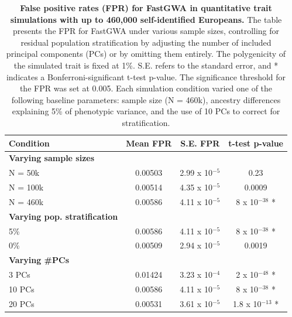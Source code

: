 \begin{table}[h!]
\centering
\caption{\textbf{False positive rates (FPR) for FastGWA in quantitative trait simulations with up to 460,000 self-identified Europeans.} The table presents the FPR for FastGWA under various sample sizes, controlling for residual population stratification by adjusting the number of included principal components (PCs) or by omitting them entirely. The polygenicity of the simulated trait is fixed at 1\%. S.E. refers to the standard error, and * indicates a Bonferroni-significant t-test p-value. The significance threshold for the FPR was set at 0.005. Each simulation condition varied one of the following baseline parameters: sample size (N = 460k), ancestry differences explaining 5\% of phenotypic variance, and the use of 10 PCs to correct for stratification.}
\begin{tabular}{|l|c|c|c|}
\hline
\textbf{Condition} & \textbf{Mean FPR} & \textbf{S.E. FPR} & \textbf{t-test p-value} \\ \hline
\textbf{Varying sample sizes} & & & \\ 
N = 50k & 0.00503 & 2.99 x 10$^{-5}$ & 0.23 \\ 
N = 100k & 0.00514 & 4.35 x 10$^{-5}$ & 0.0009 \\ 
N = 460k & 0.00586 & 4.11 x 10$^{-5}$ & 8 x 10$^{-38}$ * \\ \hline
\textbf{Varying pop. stratification} & & & \\
5\% & 0.00586 & 4.11 x 10$^{-5}$ & 8 x 10$^{-38}$ * \\ 
0\% & 0.00509 & 2.94 x 10$^{-5}$ & 0.0019 \\ \hline
\textbf{Varying \#PCs} & & & \\ 
3 PCs & 0.01424 & 3.23 x 10$^{-4}$ & 2 x 10$^{-48}$ * \\ 
10 PCs & 0.00586 & 4.11 x 10$^{-5}$ & 8 x 10$^{-38}$ * \\ 
20 PCs & 0.00531 & 3.61 x 10$^{-5}$ & 1.8 x 10$^{-13}$ * \\ \hline
\end{tabular}
\label{tab:fgwa_fpr_sims}
\end{table}

